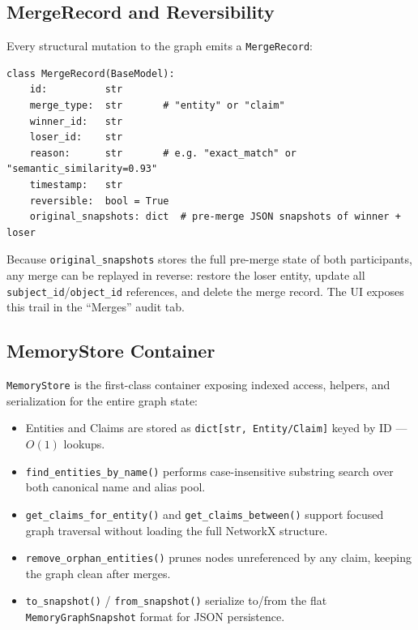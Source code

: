 \documentclass[12pt,a4paper]{article}
\begin{document}
\subsection{MergeRecord and Reversibility}

Every structural mutation to the graph emits a \texttt{MergeRecord}:

\begin{lstlisting}[caption=MergeRecord model (schema.py)]
class MergeRecord(BaseModel):
    id:          str
    merge_type:  str       # "entity" or "claim"
    winner_id:   str
    loser_id:    str
    reason:      str       # e.g. "exact_match" or "semantic_similarity=0.93"
    timestamp:   str
    reversible:  bool = True
    original_snapshots: dict  # pre-merge JSON snapshots of winner + loser
\end{lstlisting}

Because \texttt{original\_snapshots} stores the full pre-merge state of both participants, any merge can be replayed in reverse: restore the loser entity, update all \texttt{subject\_id}/\texttt{object\_id} references, and delete the merge record. The UI exposes this trail in the ``Merges'' audit tab.

\subsection{MemoryStore Container}

\texttt{MemoryStore} is the first-class container exposing indexed access, helpers, and serialization for the entire graph state:

\begin{itemize}
    \item Entities and Claims are stored as \texttt{dict[str, Entity/Claim]} keyed by ID — $O(1)$ lookups.
    \item \texttt{find\_entities\_by\_name()} performs case-insensitive substring search over both canonical name and alias pool.
    \item \texttt{get\_claims\_for\_entity()} and \texttt{get\_claims\_between()} support focused graph traversal without loading the full NetworkX structure.
    \item \texttt{remove\_orphan\_entities()} prunes nodes unreferenced by any claim, keeping the graph clean after merges.
    \item \texttt{to\_snapshot()} / \texttt{from\_snapshot()} serialize to/from the flat \texttt{MemoryGraphSnapshot} format for JSON persistence.
\end{itemize}
\end{document}
